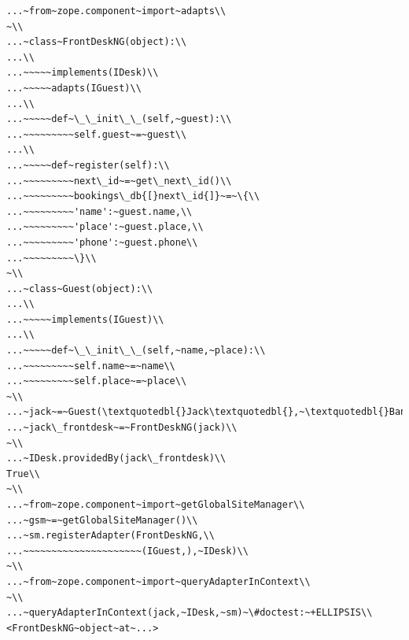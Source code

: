 \documentclass[a4paper,openany,twoside,draft]{book}
\begin{document}
\begin{verbatim}
...~from~zope.component~import~adapts\\
~\\
...~class~FrontDeskNG(object):\\
...\\
...~~~~~implements(IDesk)\\
...~~~~~adapts(IGuest)\\
...\\
...~~~~~def~\_\_init\_\_(self,~guest):\\
...~~~~~~~~~self.guest~=~guest\\
...\\
...~~~~~def~register(self):\\
...~~~~~~~~~next\_id~=~get\_next\_id()\\
...~~~~~~~~~bookings\_db{[}next\_id{]}~=~\{\\
...~~~~~~~~~'name':~guest.name,\\
...~~~~~~~~~'place':~guest.place,\\
...~~~~~~~~~'phone':~guest.phone\\
...~~~~~~~~~\}\\
~\\
...~class~Guest(object):\\
...\\
...~~~~~implements(IGuest)\\
...\\
...~~~~~def~\_\_init\_\_(self,~name,~place):\\
...~~~~~~~~~self.name~=~name\\
...~~~~~~~~~self.place~=~place\\
~\\
...~jack~=~Guest(\textquotedbl{}Jack\textquotedbl{},~\textquotedbl{}Bangalore\textquotedbl{})\\
...~jack\_frontdesk~=~FrontDeskNG(jack)\\
~\\
...~IDesk.providedBy(jack\_frontdesk)\\
True\\
~\\
...~from~zope.component~import~getGlobalSiteManager\\
...~gsm~=~getGlobalSiteManager()\\
...~sm.registerAdapter(FrontDeskNG,\\
...~~~~~~~~~~~~~~~~~~~~~(IGuest,),~IDesk)\\
~\\
...~from~zope.component~import~queryAdapterInContext\\
~\\
...~queryAdapterInContext(jack,~IDesk,~sm)~\#doctest:~+ELLIPSIS\\
<FrontDeskNG~object~at~...>
\end{verbatim}
\end{document}
